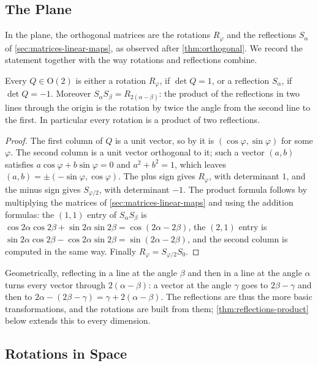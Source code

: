 \subsection{The Plane}

In the plane, the orthogonal matrices are the rotations $R_\varphi$ and the reflections $S_\alpha$ of \cref{sec:matrices-linear-maps}, as observed after \cref{thm:orthogonal}. We record the statement together with the way rotations and reflections combine.

\begin{proposition}
\label{prop:orthogonal-plane}
Every $Q\in\mathrm O(2)$ is either a rotation $R_\varphi$, if $\det Q=1$, or a reflection $S_\alpha$, if $\det Q=-1$. Moreover $S_\alpha S_\beta=R_{2(\alpha-\beta)}$: the product of the reflections in two lines through the origin is the rotation by twice the angle from the second line to the first. In particular every rotation is a product of two reflections.
\end{proposition}

\begin{proof}
The first column of $Q$ is a unit vector, so by  it is $(\cos\varphi,\sin\varphi)$ for some $\varphi$. The second column is a unit vector orthogonal to it; such a vector $(a,b)$ satisfies $a\cos\varphi+b\sin\varphi=0$ and $a^2+b^2=1$, which leaves $(a,b)=\pm(-\sin\varphi,\cos\varphi)$. The plus sign gives $R_\varphi$, with determinant $1$, and the minus sign gives $S_{\varphi/2}$, with determinant $-1$. The product formula follows by multiplying the matrices of \cref{sec:matrices-linear-maps} and using the addition formulas: the $(1,1)$ entry of $S_\alpha S_\beta$ is $\cos2\alpha\cos2\beta+\sin2\alpha\sin2\beta=\cos(2\alpha-2\beta)$, the $(2,1)$ entry is $\sin2\alpha\cos2\beta-\cos2\alpha\sin2\beta=\sin(2\alpha-2\beta)$, and the second column is computed in the same way. Finally $R_\varphi=S_{\varphi/2}S_0$.
\end{proof}

Geometrically, reflecting in a line at the angle $\beta$ and then in a line at the angle $\alpha$ turns every vector through $2(\alpha-\beta)$: a vector at the angle $\gamma$ goes to $2\beta-\gamma$ and then to $2\alpha-(2\beta-\gamma)=\gamma+2(\alpha-\beta)$. The reflections are thus the more basic transformations, and the rotations are built from them; \cref{thm:reflections-product} below extends this to every dimension.

\subsection{Rotations in Space}

